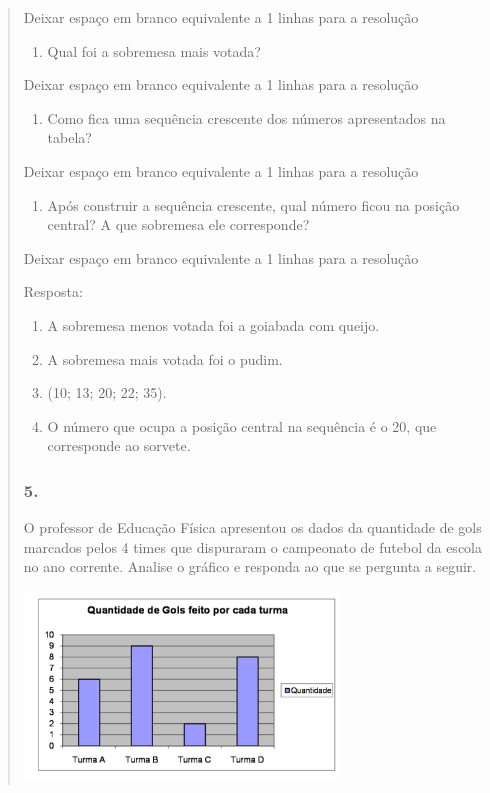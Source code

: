 \begin{enumerate}
\begin{escolha}
\begin{enumerate}
\begin{itemize}
\begin{itemize}
\begin{escolha}
\begin{quote}
\begin{escolha}
{Deixar espaço em branco equivalente a 1 linhas para a resolução

\begin{enumerate}
\def\labelenumi{\alph{enumi})}
\item
  Qual foi a sobremesa mais votada?
\end{enumerate}

Deixar espaço em branco equivalente a 1 linhas para a resolução

\begin{enumerate}
\def\labelenumi{\alph{enumi})}
\item
  Como fica uma sequência crescente dos números apresentados na tabela?
\end{enumerate}

Deixar espaço em branco equivalente a 1 linhas para a resolução

\begin{enumerate}
\def\labelenumi{\alph{enumi})}
\item
  Após construir a sequência crescente, qual número ficou na posição
  central? A que sobremesa ele corresponde?
\end{enumerate}

Deixar espaço em branco equivalente a 1 linhas para a resolução

Resposta:

\begin{enumerate}
\def\labelenumi{\alph{enumi})}
\item
  A sobremesa menos votada foi a goiabada com queijo.
\item
  A sobremesa mais votada foi o pudim.
\item
  (10; 13; 20; 22; 35).
\item
  O número que ocupa a posição central na sequência é o 20, que corresponde ao sorvete.
\end{enumerate}

\subsubsection{5.}\label{section-95}

O professor de Educação Física apresentou os dados da quantidade de gols
marcados pelos 4 times que dispuraram o campeonato de futebol da escola no ano
corrente. Analise o gráfico e responda ao que se pergunta a seguir.

\includegraphics[width=3.30769in,height=1.97201in]{media/image97.png}

}
\end{escolha}
\end{quote}
\end{escolha}
\end{itemize}
\end{itemize}
\end{enumerate}
\end{escolha}
\end{enumerate}

